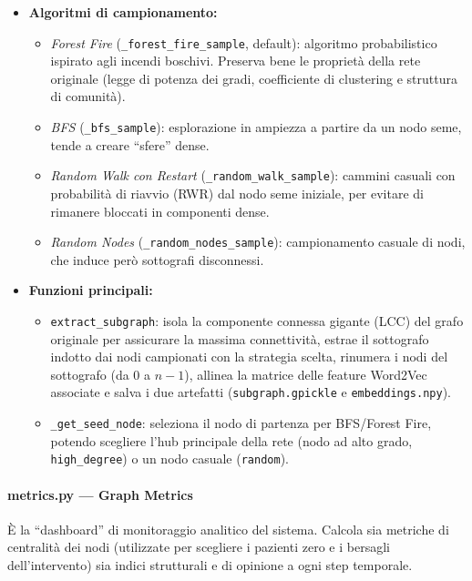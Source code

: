 \documentclass[11pt, a4paper]{article}
\begin{document}
\begin{itemize}[leftmargin=*]
    \item \textbf{Algoritmi di campionamento:}
    \begin{itemize}
        \item \textit{Forest Fire} (\texttt{\_forest\_fire\_sample}, default): algoritmo probabilistico ispirato agli incendi boschivi. Preserva bene le proprietà della rete originale (legge di potenza dei gradi, coefficiente di clustering e struttura di comunità).
        \item \textit{BFS} (\texttt{\_bfs\_sample}): esplorazione in ampiezza a partire da un nodo seme, tende a creare ``sfere'' dense.
        \item \textit{Random Walk con Restart} (\texttt{\_random\_walk\_sample}): cammini casuali con probabilità di riavvio (RWR) dal nodo seme iniziale, per evitare di rimanere bloccati in componenti dense.
        \item \textit{Random Nodes} (\texttt{\_random\_nodes\_sample}): campionamento casuale di nodi, che induce però sottografi disconnessi.
    \end{itemize}
    \item \textbf{Funzioni principali:}
    \begin{itemize}
        \item \texttt{extract\_subgraph}: isola la componente connessa gigante (LCC) del grafo originale per assicurare la massima connettività, estrae il sottografo indotto dai nodi campionati con la strategia scelta, rinumera i nodi del sottografo (da 0 a $n-1$), allinea la matrice delle feature Word2Vec associate e salva i due artefatti (\texttt{subgraph.gpickle} e \texttt{embeddings.npy}).
        \item \texttt{\_get\_seed\_node}: seleziona il nodo di partenza per BFS/Forest Fire, potendo scegliere l'hub principale della rete (nodo ad alto grado, \texttt{high\_degree}) o un nodo casuale (\texttt{random}).
    \end{itemize}
\end{itemize}

\paragraph{metrics.py — Graph Metrics}
È la ``dashboard'' di monitoraggio analitico del sistema. Calcola sia metriche di centralità dei nodi (utilizzate per scegliere i pazienti zero e i bersagli dell'intervento) sia indici strutturali e di opinione a ogni step temporale.
\end{document}
